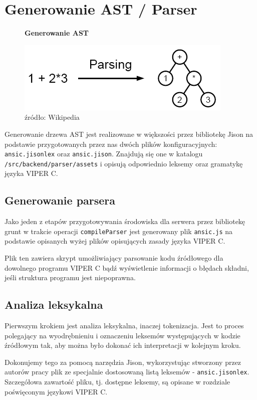 \documentclass[a4paper,twoside,openright,11pt]{report}
\begin{document}
  \section{Generowanie AST / Parser}
\begin{figure}[H]
  \centering
  \textbf{Generowanie AST}\par \medskip
  \includegraphics[scale=0.7]{parsing}
  \caption{źródło: Wikipedia}
\end{figure}


\par Generowanie drzewa AST jest realizowane w większości przez bibliotekę Jison na podstawie przygotowanych przez nas dwóch plików konfiguracyjnych: \texttt{ansic.jisonlex} oraz \texttt{ansic.jison}. Znajdują się one w katalogu \texttt{/src/backend/parser/assets} i opisują odpowiednio leksemy oraz gramatykę języka VIPER C.

  \subsection {Generowanie parsera}
\par Jako jeden z etapów przygotowywania środowiska dla serwera przez bibliotekę grunt w trakcie operacji \texttt{compileParser} jest generowany plik \texttt{ansic.js} na podstawie opisanych wyżej plików opisujących zasady języka VIPER C. 
\par Plik ten zawiera skrypt umożliwiający parsowanie kodu źródłowego dla dowolnego programu VIPER C bądź wyświetlenie informacji o błędach składni, jeśli struktura programu jest niepoprawna. 

  \subsection {Analiza leksykalna}
\par Pierwszym krokiem jest analiza leksykalna, inaczej tokenizacja. Jest to proces polegający na wyodrębnieniu i oznaczeniu leksemów występujących w kodzie źródłowym tak, aby można było dokonać ich interpretacji w kolejnym kroku.
\par Dokonujemy tego za pomocą narzędzia Jison, wykorzystując stworzony przez autorów pracy plik ze specjalnie dostosowaną listą leksemów - \texttt{ansic.jisonlex}. Szczegółowa zawartość pliku, tj. dostępne leksemy, są opisane w rozdziale poświęconym językowi VIPER C.
\end{document}
